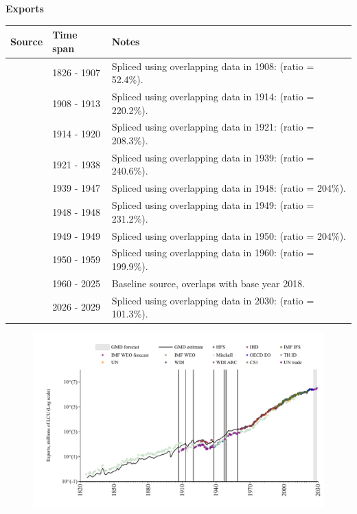 \documentclass[12pt,a4paper,landscape]{article}
\begin{document}
\begin{adjustbox}{max totalsize={\paperwidth}{\paperheight},center}
\begin{minipage}[t][\textheight][t]{\textwidth}
\vspace*{0.5cm}
{}
\begin{center}
{\Large\bfseries Exports}
\end{center}
\vspace{0.5cm}
\begin{table}[H]
\centering
\small
\begin{tabular}{|l|l|l|}
\hline
\textbf{Source} & \textbf{Time span} & \textbf{Notes} \\
\hline
\rowcolor{white}\cite{Mitchell}& 1826 - 1907 &Spliced using overlapping data in 1908: (ratio = 52.4\%). \\
\rowcolor{lightgray}\cite{UN_trade}& 1908 - 1913 &Spliced using overlapping data in 1914: (ratio = 220.2\%). \\
\rowcolor{white}\cite{Mitchell}& 1914 - 1920 &Spliced using overlapping data in 1921: (ratio = 208.3\%). \\
\rowcolor{lightgray}\cite{UN_trade}& 1921 - 1938 &Spliced using overlapping data in 1939: (ratio = 240.6\%). \\
\rowcolor{white}\cite{Mitchell}& 1939 - 1947 &Spliced using overlapping data in 1948: (ratio = 204\%). \\
\rowcolor{lightgray}\cite{UN_trade}& 1948 - 1948 &Spliced using overlapping data in 1949: (ratio = 231.2\%). \\
\rowcolor{white}\cite{Mitchell}& 1949 - 1949 &Spliced using overlapping data in 1950: (ratio = 204\%). \\
\rowcolor{lightgray}\cite{UN_trade}& 1950 - 1959 &Spliced using overlapping data in 1960: (ratio = 199.9\%). \\
\rowcolor{white}\cite{OECD_EO}& 1960 - 2025 &Baseline source, overlaps with base year 2018. \\
\rowcolor{lightgray}\cite{IMF_WEO_forecast}& 2026 - 2029 &Spliced using overlapping data in 2030: (ratio = 101.3\%). \\
\hline
\end{tabular}
\end{table}
\begin{figure}[H]
\centering
\includegraphics[width=\textwidth,height=0.6\textheight,keepaspectratio]{graphs/ZAF_exports.pdf}

\end{figure}
\end{minipage}
\end{adjustbox}
\end{document}
